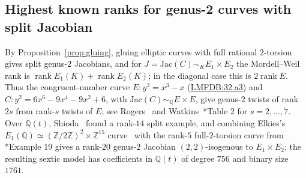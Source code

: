 \documentclass{amsart}
\newcommand{\Q}{{\mathbb Q}}
\newcommand{\Z}{{\mathbb Z}}
\newcommand{\Jac}{\mathrm{Jac}}
\DeclareMathOperator{\rank}{\mathrm{rank}}
\begin{document}
\subsection{Highest known ranks for genus-2 curves with split Jacobian}\label{ssec:highest}

By Proposition~\ref{prop:gluing}, gluing elliptic curves with full rational
$2$-torsion gives split genus-$2$ Jacobians, and for
$J=\Jac(C)\sim_K E_1\times E_2$ the Mordell--Weil rank is
$\rank E_1(K)+\rank E_2(K)$; in the diagonal case this is $2\rank E$. Thus the
congruent-number curve \(E:y^2=x^3-x\)
(\href{https://www.lmfdb.org/EllipticCurve/Q/32/a/3}{LMFDB:32.a3}) and
\(C:y^2=6x^6-9x^4-9x^2+6\), with \(\Jac(C)\sim_{\Q}E\times E\), give
genus-\(2\) twists of rank \(2s\) from rank-\(s\) twists of \(E\); see
Rogers~\cite{Rogers2000} and Watkins~\cite{Watkins2014}*{Table 2} for
\(s=2,\ldots,7\). Over \(\Q(t)\), Shioda~\cite{Shioda1997} found a rank-\(14\)
split example, and combining Elkies's
\(E_1(\Q)\simeq(\Z/2\Z)^2\times\Z^{15}\) curve~\cite{Elkies2009} with the
rank-\(5\) full-\(2\)-torsion curve from
\cite{DujellaPeral2020}*{Example 19} gives a rank-\(20\) genus-\(2\) Jacobian
\((2,2)\)-isogenous to \(E_1\times E_2\); the resulting sextic model has
coefficients in \(\Q(t)\) of degree \(756\) and binary size \(1761\).





\end{document}
